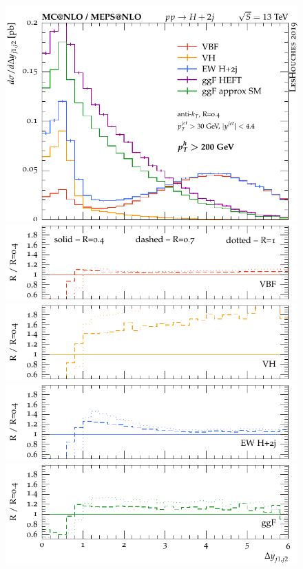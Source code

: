 \documentclass[10pt,prd,fleqn,superscriptaddress,notitlepage,nofootinbib,preprintnumbers,nobalancelastpage]{revtex4-1}
\begin{document}
\begin{figure}[p]
\begin{minipage}{.2925\textwidth}
  \end{minipage}\hfill
  \begin{minipage}{.2925\textwidth}
    \includegraphics[width=\textwidth]{figures/channels/delta_y_jj12_pth200.pdf}
    \includegraphics[width=\textwidth]{figures/channels/delta_y_jj12_pth200_rVBF.pdf}
    \includegraphics[width=\textwidth]{figures/channels/delta_y_jj12_pth200_rVH.pdf}
    \includegraphics[width=\textwidth]{figures/channels/delta_y_jj12_pth200_rHJJ.pdf}
    \includegraphics[width=\textwidth]{figures/channels/delta_y_jj12_pth200_rGGH.pdf}

\end{minipage}
\end{figure}
\end{document}
